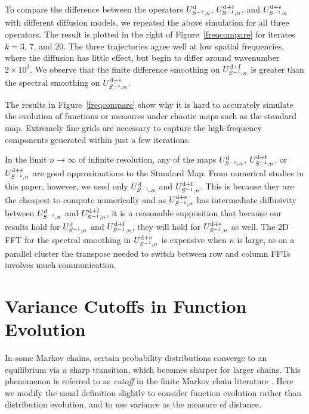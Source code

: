 \documentclass{aims}
\theoremstyle{definition}
\begin{document}
To compare the difference between the operators $U_{S^{-1},n}^{\rm
  d}$, $U_{S^{-1},n}^{\rm d+f}$, and $U_{S^{-1},n}^{\rm d+s}$ with
different diffusion models, we repeated the above simulation for all
three operators. The result is plotted in the right of
Figure~\ref{freqcompare} for iterates $k = 3$, $7$, and $20$. The
three trajectories agree well at low spatial frequencies, where the
diffusion has little effect, but begin to differ around wavenumber $2
\times 10^3$. We observe that the finite difference smoothing on
$U_{S^{-1},n}^{\rm d+f}$ is greater than the spectral smoothing on
$U_{S^{-1},n}^{\rm d+s}$.

The results in Figure~\ref{freqcompare} show why it is hard to
accurately simulate the evolution of functions or measures under
chaotic maps such as the standard map. Extremely fine grids are
necessary to capture the high-frequency components generated within
just a few iterations.

In the limit $n \to \infty$ of infinite resolution, any of the maps
$U_{S^{-1},n}^{\rm d}$, $U_{S^{-1},n}^{\rm d+f}$, or
$U_{S^{-1},n}^{\rm d+s}$ are good approximations to the Standard
Map. From numerical studies in this paper, however, we used only
$U_{S^{-1},n}^{\rm d}$ and $U_{S^{-1},n}^{\rm d+f}$. This is because
they are the cheapest to compute numerically and as $U_{S^{-1},n}^{\rm
  d+s}$ has intermediate diffusivity between $U_{S^{-1},n}^{\rm d}$ and
$U_{S^{-1},n}^{\rm d+f}$, it is a reasonable supposition that because
our results hold for $U_{S^{-1},n}^{\rm d}$ and $U_{S^{-1},n}^{\rm
  d+f}$, they will hold for $U_{S^{-1},n}^{\rm d+s}$ as well. The 2D
FFT for the spectral smoothing in $U_{S^{-1},n}^{\rm d+s}$ is
expensive when $n$ is large, as on a parallel cluster the transpose
needed to switch between row and column FFTs involves much
communication.

\section{Variance Cutoffs in Function Evolution}
\label{sec:cutoffs-funct-evol}

In some Markov chains, certain probability distributions converge to
an equilibrium via a sharp transition, which becomes sharper for
larger chains. This phenomenon is referred to as \emph{cutoff} in the
finite Markov chain literature \cite{Diaconis2005, Chen2006}. Here we
modify the usual definition slightly to consider function evolution
rather than distribution evolution, and to use variance as the measure
of distance.
\end{document}
